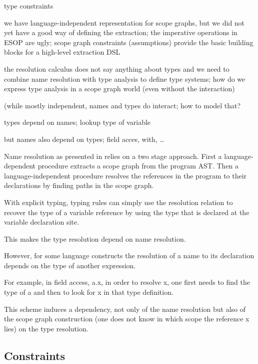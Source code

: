 type constraints
    


we have language-independent representation for scope graphs, but we did not
yet have a good way of defining the extraction; the imperative operations in
ESOP are ugly; scope graph constraints (assumptions) provide the basic building
blocks for a high-level extraction DSL


the resolution calculus does not say anything about types and we need to
combine name resolution with type analysis to define type systems; how do we
express type analysis in a scope graph world (even without the interaction)

(while mostly independent, names and types do interact; how to model that?

types depend on names; lookup type of variable

but names also depend on types; field acces, with, \ldots


Name resolution as presented in \cite{NeronTVW-ESOP-2015} relies on a two stage
approach. First a language-dependent procedure extracts a scope graph from the
program AST. Then a language-independent procedure resolves the references in
the program to their declarations by finding paths in the scope graph.

With explicit typing, typing rules can simply use the resolution relation to
recover the type of a variable reference by using the type that is declared at
the variable declaration site.

This makes the type resolution depend on name resolution. 

However, for some language constructs the resolution of a name to its
declaration depends on the type of another expression.

For example, in field access, {\sf a.x}, in order to resolve {\sf x}, one first
needs to find the type of {\sf a} and then to look for {\sf x} in that type
definition.

This scheme induces a dependency, not only of the name
resolution but also of the scope graph construction (one does not know in which
scope the reference {\sf x} lies) on the type resolution.

\subsection{Constraints}


